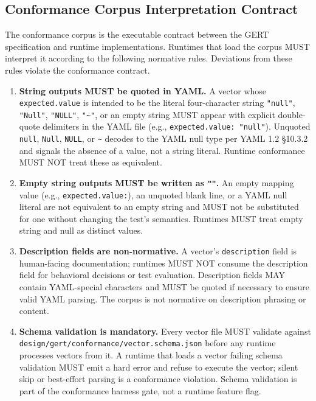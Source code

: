 \subsection{Conformance Corpus Interpretation Contract}

\label{subsec:conformance-contract}

The conformance corpus is the executable contract between the GERT specification and runtime implementations. Runtimes that load the corpus MUST interpret it according to the following normative rules. Deviations from these rules violate the conformance contract.

\begin{enumerate}[label=\arabic*.]

  \item \textbf{String outputs MUST be quoted in YAML.} A vector whose \texttt{expected.value} is intended to be the literal four-character string \texttt{"null"}, \texttt{"Null"}, \texttt{"NULL"}, \texttt{"\textasciitilde"}, or an empty string MUST appear with explicit double-quote delimiters in the YAML file (e.g., \texttt{expected.value: "null"}). Unquoted \texttt{null}, \texttt{Null}, \texttt{NULL}, or \texttt{\textasciitilde} decodes to the YAML null type per YAML 1.2 \S10.3.2 and signals the absence of a value, not a string literal. Runtime conformance MUST NOT treat these as equivalent.

  \item \textbf{Empty string outputs MUST be written as \texttt{""}.} An empty mapping value (e.g., \texttt{expected.value:}), an unquoted blank line, or a YAML null literal are not equivalent to an empty string and MUST not be substituted for one without changing the test's semantics. Runtimes MUST treat empty string and null as distinct values.

  \item \textbf{Description fields are non-normative.} A vector's \texttt{description} field is human-facing documentation; runtimes MUST NOT consume the description field for behavioral decisions or test evaluation. Description fields MAY contain YAML-special characters and MUST be quoted if necessary to ensure valid YAML parsing. The corpus is not normative on description phrasing or content.

  \item \textbf{Schema validation is mandatory.} Every vector file MUST validate against \texttt{design/gert/conformance/vector.schema.json} before any runtime processes vectors from it. A runtime that loads a vector failing schema validation MUST emit a hard error and refuse to execute the vector; silent skip or best-effort parsing is a conformance violation. Schema validation is part of the conformance harness gate, not a runtime feature flag.


\end{enumerate}
